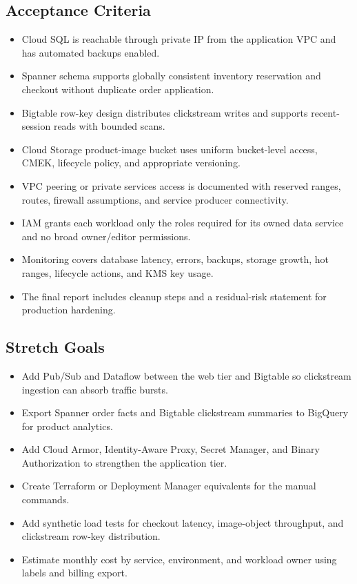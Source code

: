 \subsection*{Acceptance Criteria}
\begin{itemize}
    \item Cloud SQL is reachable through private IP from the application VPC and has automated backups enabled.
    \item Spanner schema supports globally consistent inventory reservation and checkout without duplicate order application.
    \item Bigtable row-key design distributes clickstream writes and supports recent-session reads with bounded scans.
    \item Cloud Storage product-image bucket uses uniform bucket-level access, CMEK, lifecycle policy, and appropriate versioning.
    \item VPC peering or private services access is documented with reserved ranges, routes, firewall assumptions, and service producer connectivity.
    \item IAM grants each workload only the roles required for its owned data service and no broad owner/editor permissions.
    \item Monitoring covers database latency, errors, backups, storage growth, hot ranges, lifecycle actions, and KMS key usage.
    \item The final report includes cleanup steps and a residual-risk statement for production hardening.
\end{itemize}

\subsection*{Stretch Goals}
\begin{itemize}
    \item Add Pub/Sub and Dataflow between the web tier and Bigtable so clickstream ingestion can absorb traffic bursts.
    \item Export Spanner order facts and Bigtable clickstream summaries to BigQuery for product analytics.
    \item Add Cloud Armor, Identity-Aware Proxy, Secret Manager, and Binary Authorization to strengthen the application tier.
    \item Create Terraform or Deployment Manager equivalents for the manual commands.
    \item Add synthetic load tests for checkout latency, image-object throughput, and clickstream row-key distribution.
    \item Estimate monthly cost by service, environment, and workload owner using labels and billing export.
\end{itemize}
